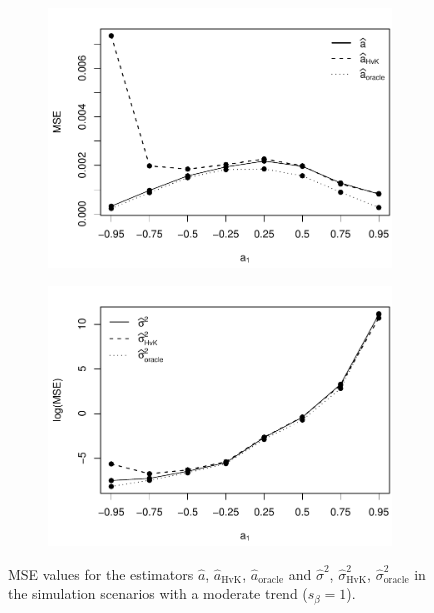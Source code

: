 \begin{figure}[t!]
\begin{subfigure}[b]{0.475\textwidth}
\includegraphics[width=\textwidth]{Plots/MSE_a1_T=500_slope=1_(q,K1,K2,M1,M2)=(25,2,10,20,30).pdf}
\end{subfigure}\hspace{0.25cm}
\begin{subfigure}[b]{0.475\textwidth}
\includegraphics[width=\textwidth]{Plots/MSE_lrv_T=500_slope=1_(q,K1,K2,M1,M2)=(25,2,10,20,30).pdf}
\end{subfigure}
\caption{MSE values for the estimators $\widehat{a}$, $\widehat{a}_{\text{HvK}}$, $\widehat{a}_{\text{oracle}}$ and $\widehat{\sigma}^2$, $\widehat{\sigma}^2_{\text{HvK}}$, $\widehat{\sigma}^2_{\text{oracle}}$ in the simulation scenarios with a moderate trend ($s_\beta=1$).}\label{fig:MSE_slope1}
\end{figure}


